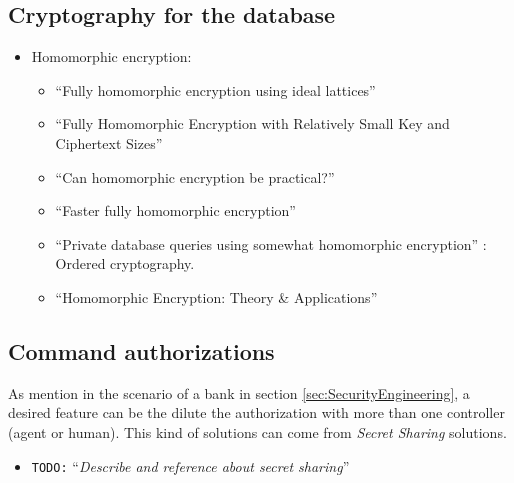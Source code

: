 \documentclass[10pt,a4paper,twoside]{llncs}
\newcommand{\todo}[1]{\texttt{\color{red}TODO:} ``\emph{#1}''}
\begin{document}
\subsection{Cryptography for the database}
    \begin{itemize}
        \item Homomorphic encryption:
        \begin{itemize}
            \item ``Fully homomorphic encryption using ideal lattices'' \cite{Gentry:2009:FHE:1536414.1536440}
            \item ``Fully Homomorphic Encryption with Relatively Small Key and Ciphertext Sizes''\cite{SmartVecauteren10}
            \item ``Can homomorphic encryption be practical?'' \cite{Naehrig:2011:HEP:2046660.2046682}
            \item ``Faster fully homomorphic encryption'' \cite{stehle2010faster}
            \item ``Private database queries using somewhat homomorphic encryption'' \cite{iacr422}: Ordered cryptography.
            \item ``Homomorphic Encryption: Theory \& Applications'' \cite{Jaydip2013}
        \end{itemize}

    \end{itemize}

\subsection{Command authorizations}

As mention in the scenario of a bank in section \ref{sec:SecurityEngineering}, a desired feature can be the dilute the authorization with more than one controller (agent or human). This kind of solutions can come from \emph{Secret Sharing} solutions.

\begin{itemize}
    \item \todo{Describe and reference about secret sharing}
\end{itemize}
\end{document}
